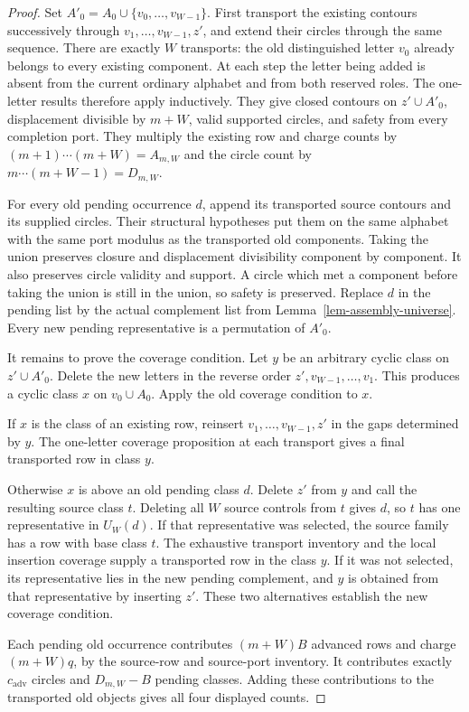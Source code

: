 \begin{proof}
Set $A'_0=A_0\cup\{v_0,\ldots,v_{W-1}\}$. First transport the
existing contours successively through
$v_1,\ldots,v_{W-1},z'$, and extend their circles through the same
sequence. There are exactly $W$ transports: the old distinguished letter
$v_0$ already belongs to every existing component. At each step the
letter being added is absent from the current ordinary alphabet and from
both reserved roles. The one-letter results therefore apply inductively.
They give closed contours on $z'\cup A'_0$, displacement divisible by
$m+W$, valid supported circles, and safety from every completion port.
They multiply the existing row and charge counts by
$(m+1)\cdots(m+W)=A_{m,W}$ and the circle count by
$m\cdots(m+W-1)=D_{m,W}$.

For every old pending occurrence $d$, append its transported source
contours and its supplied circles. Their structural hypotheses put them
on the same alphabet with the same port modulus as the transported old
components. Taking the union preserves closure and displacement
divisibility component by component. It also preserves circle validity
and support. A circle which met a component before taking the union is
still in the union, so safety is preserved. Replace $d$ in the pending
list by the actual complement list from
Lemma~\ref{lem-assembly-universe}. Every new pending representative is
a permutation of $A'_0$.

It remains to prove the coverage condition. Let $y$ be an arbitrary
cyclic class on $z'\cup A'_0$. Delete the new letters in the reverse
order $z',v_{W-1},\ldots,v_1$. This produces a cyclic class $x$ on
$v_0\cup A_0$. Apply the old coverage condition to $x$.

If $x$ is the class of an existing row, reinsert
$v_1,\ldots,v_{W-1},z'$ in the gaps determined by $y$. The one-letter
coverage proposition at each transport gives a final transported row
in class $y$.

Otherwise $x$ is above an old pending class $d$. Delete $z'$ from $y$
and call the resulting source class $t$. Deleting all $W$ source
controls from $t$ gives $d$, so $t$ has one representative in $U_W(d)$.
If that representative was selected, the source family has a row with
base class $t$. The exhaustive transport inventory and the local
insertion coverage supply a transported row in the class $y$. If it was
not selected, its representative lies in the new pending complement,
and $y$ is obtained from that representative by inserting $z'$. These
two alternatives establish the new coverage condition.

Each pending old occurrence contributes $(m+W)B$ advanced rows and
charge $(m+W)q$, by the source-row and source-port inventory. It
contributes exactly $c_{\mathrm{adv}}$ circles and $D_{m,W}-B$ pending
classes. Adding these contributions to the transported old objects gives
all four displayed counts.
\end{proof}

